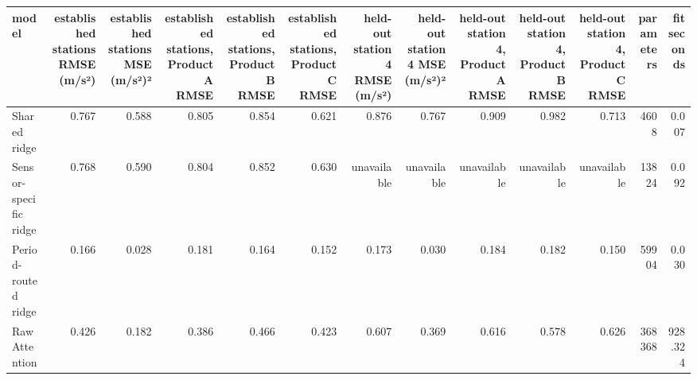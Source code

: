 \begin{tabular}{lrrrrrrrrrrrr}
\toprule
model & established stations RMSE (m/s²) & established stations MSE (m/s²)² & established stations, Product A RMSE & established stations, Product B RMSE & established stations, Product C RMSE & held-out station 4 RMSE (m/s²) & held-out station 4 MSE (m/s²)² & held-out station 4, Product A RMSE & held-out station 4, Product B RMSE & held-out station 4, Product C RMSE & parameters & fit seconds \\
\midrule
Shared ridge & 0.767 & 0.588 & 0.805 & 0.854 & 0.621 & 0.876 & 0.767 & 0.909 & 0.982 & 0.713 & 4608 & 0.007 \\
Sensor-specific ridge & 0.768 & 0.590 & 0.804 & 0.852 & 0.630 & unavailable & unavailable & unavailable & unavailable & unavailable & 13824 & 0.092 \\
Period-routed ridge & 0.166 & 0.028 & 0.181 & 0.164 & 0.152 & 0.173 & 0.030 & 0.184 & 0.182 & 0.150 & 59904 & 0.030 \\
Raw Attention & 0.426 & 0.182 & 0.386 & 0.466 & 0.423 & 0.607 & 0.369 & 0.616 & 0.578 & 0.626 & 368368 & 928.324 \\
\bottomrule
\end{tabular}

